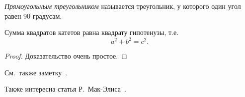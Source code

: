 
\begin{definition}
    \label{def:202211081146}
    \emph{Прямоугольным треугольником} называется треугольник, у которого один угол равен 90 градусам.
\end{definition}

\begin{theorem}
    \label{thm:202211081146}
    Сумма квадратов катетов равна квадрату гипотенузы, т.е.
    \[
        a^2+b^2=c^2.
    \]
\end{theorem}
\begin{proof}
    Доказательство очень простое.
\end{proof}

\seealso

См.~также заметку~.

Также интересна статья Р.~Мак-Элиса~\cite{j.mceliece1978}.